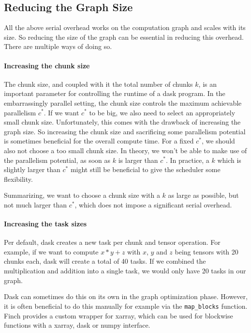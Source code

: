 \subsection{Reducing the Graph Size}

All the above serial overhead works on the computation graph and scales with its size.
So reducing the size of the graph can be essential in reducing this overhead.
There are multiple ways of doing so.

\paragraph{Increasing the chunk size}

The chunk size, and coupled with it the total number of chunks $k$, is an important parameter for controlling the runtime of a dask program.
In the embarrassingly parallel setting, the chunk size controls the maximum achievable parallelism $c^*$.
If we want $c^*$ to be big, we also need to select an appropriately small chunk size.
Unfortunately, this comes with the drawback of increasing the graph size.
So increasing the chunk size and sacrificing some parallelism potential is sometimes beneficial for the overall compute time.
For a fixed $c^*$, we should also not choose a too small chunk size.
In theory, we won't be able to make use of the parallelism potential, as soon as $k$ is larger than $c^*$.
In practice, a $k$ which is slightly larger than $c^*$ might still be beneficial to give the scheduler some flexibility.

Summarizing, we want to choose a chunk size with a $k$ as large as possible, but not much larger than $c^*$, which does not impose a significant serial overhead.

\paragraph{Increasing the task sizes}

Per default, dask creates a new task per chunk and tensor operation.
For example, if we want to compute $x*y + z$ with $x$, $y$ and $z$ being tensors with 20 chunks each, dask will create a total of 40 tasks.
If we combined the multiplication and addition into a single task, we would only have 20 tasks in our graph.

Dask can sometimes do this on its own in the graph optimization phase. However, it is often beneficial to do this manually for example via the \lstinline{map_blocks} function.
Finch provides a custom wrapper for xarray, which can be used for blockwise functions with a xarray, dask or numpy interface.

